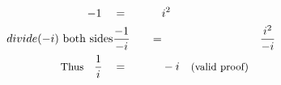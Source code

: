 \begin{alignat*}{5}
&\,&-1\quad&=\quad&&i^2\\
&\small &divide(-i)\text{ both sides}&\frac{-1}{-i}\quad&=&&\frac{i^2}{-i}\\
&\,&\small\text{Thus}\quad\frac{1}{i}\quad&=&&-i\quad\small\text{(valid proof)}
\end{alignat*}
